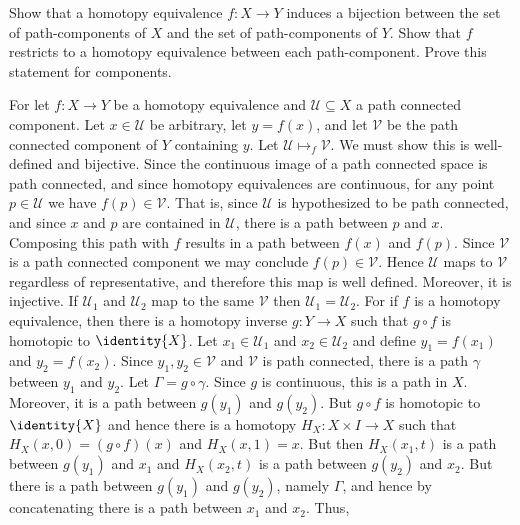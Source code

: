 \documentclass{book}                                                           %
\begin{document}
\begin{problem}
    Show that a homotopy equivalence $f:X\rightarrow{Y}$ induces a bijection
    between the set of path-components of $X$ and the set of path-components
    of $Y$. Show that $f$ restricts to a homotopy equivalence between each
    path-component. Prove this statement for components.
\end{problem}
\begin{solution}
    For let $f:X\rightarrow{Y}$ be a homotopy equivalence and
    $\mathcal{U}\subseteq{X}$ a path connected component. Let
    $x\in\mathcal{U}$ be arbitrary, let $y=f(x)$, and let $\mathcal{V}$ be
    the path connected component of $Y$ containing $y$. Let
    $\mathcal{U}\mapsto_{f}\mathcal{V}$. We must show this is well-defined
    and bijective. Since the continuous image of a path connected space is
    path connected, and since homotopy equivalences are continuous, for any
    point $p\in\mathcal{U}$ we have $f(p)\in\mathcal{V}$. That is, since
    $\mathcal{U}$ is hypothesized to be path connected, and since $x$ and
    $p$ are contained in $\mathcal{U}$, there is a path between $p$ and $x$.
    Composing this path with $f$ results in a path between $f(x)$ and
    $f(p)$. Since $\mathcal{V}$ is a path connected component we may
    conclude $f(p)\in\mathcal{V}$. Hence $\mathcal{U}$ maps to $\mathcal{V}$
    regardless of representative, and therefore this map is well defined.
    Moreover, it is injective. If
    $\mathcal{U}_{1}$ and $\mathcal{U}_{2}$ map to the same $\mathcal{V}$
    then $\mathcal{U}_{1}=\mathcal{U}_{2}$. For if $f$ is a homotopy
    equivalence, then there is a homotopy inverse $g:Y\rightarrow{X}$ such
    that $g\circ{f}$ is homotopic to $\identity{X}$. Let
    $x_{1}\in\mathcal{U}_{1}$ and $x_{2}\in\mathcal{U}_{2}$ and define
    $y_{1}=f(x_{1})$ and $y_{2}=f(x_{2})$. Since $y_{1},y_{2}\in\mathcal{V}$
    and $\mathcal{V}$ is path connected, there is a path $\gamma$ between
    $y_{1}$ and $y_{2}$. Let $\Gamma=g\circ\gamma$. Since $g$ is continuous,
    this is a path in $X$. Moreover, it is a path between $g(y_{1})$ and
    $g(y_{2})$. But $g\circ{f}$ is homotopic to $\identity{X}$
    and hence there is a homotopy $H_{X}:X\times{I}\rightarrow{X}$ such that
    $H_{X}(x,0)=(g\circ{f})(x)$ and $H_{X}(x,1)=x$. But then
    $H_{X}(x_{1},t)$ is a path between $g(y_{1})$ and $x_{1}$ and
    $H_{X}(x_{2},t)$ is a path between $g(y_{2})$ and $x_{2}$. But there is
    a path between $g(y_{1})$ and $g(y_{2})$, namely $\Gamma$, and hence by
    concatenating there is a path between $x_{1}$ and $x_{2}$. Thus,

\end{solution}
\end{document}
